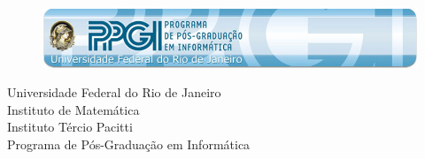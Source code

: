   \begin{capa}%
    \begin{figure}[h!]%
        \centering%
        \includegraphics[width=\textwidth]{figs/banner.jpg}
      \end{figure}%
    \center
	\ABNTEXchapterfont\large{Universidade Federal do Rio de Janeiro\\ Instituto de Matemática\\Instituto Tércio Pacitti\\Programa de Pós-Graduação em Informática}

    \vfill
    \ABNTEXchapterfont\bfseries\LARGE\imprimirtitulo
    \vfill

	\ABNTEXchapterfont\large\imprimirautor
	\vfill
%
	
    \large\imprimirlocal
    \\\large\imprimirdata

    \vspace*{1cm}
  \end{capa}
